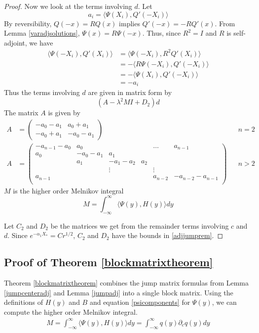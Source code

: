 \documentclass[thesis.tex]{subfiles}
\begin{document}
\begin{lemma}
\begin{proof}
Now we look at the terms involving $d$. Let
\[
a_i = \langle \Psi(X_i), Q'(-X_i) \rangle 
\]
By reversibility, $Q(-x) = R Q(x)$ implies $Q'(-x) = -R Q'(x)$. From Lemma \ref{varadjsolutions}, $\Psi(x) = R \Psi(-x)$. Thus, since $R^2 = I$ and $R$ is self-adjoint, we have
\begin{align*}
\langle \Psi(-X_i), Q'(X_i) \rangle &= \langle \Psi(-X_i), R^2 Q'(X_i) \rangle \\
&= -\langle R \Psi(-X_i), Q'(-X_i) \rangle \\
&= -\langle \Psi(X_i), Q'(-X_i) \rangle \\
&= -a_i
\end{align*}
Thus the terms involving $d$ are given in matrix form by
\[
(A - \lambda^2 M I + D_2)d
\]
The matrix $A$ is given by
\begin{align*}
A &= \begin{pmatrix}
-a_0 -a_1 & a_0 + a_1 \\
-a_0 + a_1 & -a_0 - a_1
\end{pmatrix} && n = 2 \\
A &= \begin{pmatrix}
-a_{n-1} - a_0 & a_0 & & & \dots & a_{n-1}\\
a_0 & -a_0 - a_1 &  a_1 \\
& a_1 & -a_1 - a_2 &  a_2 \\
& & \vdots & & \vdots \\
a_{n-1} & & & & a_{n-2} & -a_{n-2} - a_{n-1} \\
\end{pmatrix} && n > 2
\end{align*}
$M$ is the higher order Melnikov integral
\[
M = \int_{-\infty}^\infty \langle \Psi(y), H(y) \rangle dy
\]

Let $C_2$ and $D_2$ be the matrices we get from the remainder terms involving $c$ and $d$. Since $e^{-\alpha_1 X_*} = C r^{1/2}$, $C_2$ and $D_2$ have the bounds in \cref{adjjumprem}.
\end{proof}
\end{lemma}

\subsection{Proof of Theorem \ref{blockmatrixtheorem}}

Theorem \ref{blockmatrixtheorem} combines the jump matrix formulas from Lemma \ref{jumpcenteradj} and Lemma \ref{jumpadj} into a single block matrix. Using the definitions of $H(y)$ and $B$ and equation \cref{psicomponents} for $\Psi(y)$, we can compute the higher order Melnikov integral.
\begin{align*}
M = \int_{-\infty}^\infty \langle \Psi(y), H(y) \rangle dy = \int_{-\infty}^\infty q(y) \partial_c q(y) dy
\end{align*}


\iffulldocument\else
	
	
\fi
\end{document}
